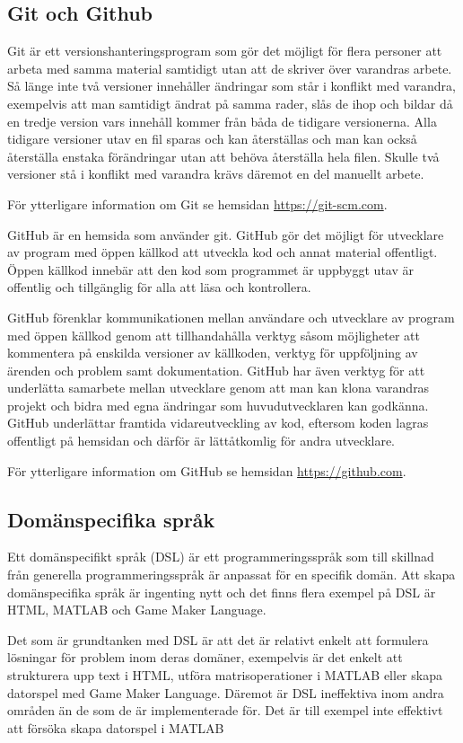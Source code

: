 \documentclass[]{article}
\begin{document}
\subsection{Git och Github}
Git är ett versionshanteringsprogram som gör det möjligt för flera personer att
arbeta med samma material samtidigt utan att de skriver över varandras arbete.
Så länge inte två versioner innehåller ändringar som står i konflikt med
varandra, exempelvis att man samtidigt ändrat på samma rader, slås de ihop och
bildar då en tredje version vars innehåll kommer från båda de tidigare
versionerna. Alla tidigare versioner utav en fil sparas och kan återställas och
man kan också återställa enstaka förändringar utan att behöva återställa hela
filen. Skulle två versioner stå i konflikt med varandra krävs däremot en del
manuellt arbete.

För ytterligare information om Git se hemsidan \url{https://git-scm.com}.

GitHub är en hemsida som använder git. GitHub gör det möjligt för utvecklare av
program med öppen källkod att utveckla kod och annat material offentligt.
Öppen källkod innebär att den kod som programmet är uppbyggt utav är offentlig
och tillgänglig för alla att läsa och kontrollera.

GitHub förenklar kommunikationen mellan användare och utvecklare av program med
öppen källkod genom att tillhandahålla verktyg såsom möjligheter att kommentera
på enskilda versioner av källkoden, verktyg för uppföljning av ärenden och
problem samt dokumentation. GitHub har även verktyg för att underlätta samarbete
mellan utvecklare genom att man kan klona varandras projekt och bidra med egna
ändringar som huvudutvecklaren kan godkänna. GitHub underlättar framtida
vidareutveckling av kod, eftersom koden lagras offentligt på hemsidan och
därför är lättåtkomlig för andra utvecklare.

För ytterligare information om GitHub se hemsidan \url{https://github.com}.


\subsection{Domänspecifika språk}
Ett domänspecifikt språk (\gls{DSL}) är ett programmeringsspråk som till
skillnad från generella programmeringsspråk är anpassat för en
specifik domän. Att skapa domänspecifika språk är ingenting nytt och det
finns flera exempel på DSL är HTML, MATLAB och Game Maker Language.

Det som är grundtanken med DSL är att det är relativt enkelt att formulera lösningar
för problem inom deras domäner, exempelvis är det enkelt att strukturera upp text i
HTML, utföra matrisoperationer i MATLAB eller skapa datorspel med Game Maker Language.
Däremot är DSL ineffektiva inom andra områden än de som de är implementerade för.
Det är till exempel inte effektivt att försöka skapa datorspel i MATLAB
\end{document}
